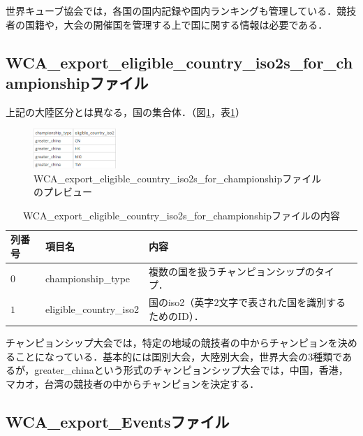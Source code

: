 \documentclass{article}
\begin{document}
  世界キューブ協会では，各国の国内記録や国内ランキングも管理している．競技者の国籍や，大会の開催国を管理する上で国に関する情報は必要である．\par

  \subsection{WCA\_export\_eligible\_country\_iso2s\_for\_championshipファイル}

  上記の大陸区分とは異なる，国の集合体．（図\ref{figure:eligible}，表\ref{table:eligible}）\par

  \begin{figure}[h]
    \centering
    \includegraphics[height=15mm]{eligible.png}
    \caption{WCA\_export\_eligible\_country\_iso2s\_for\_championshipファイルのプレビュー}
    \label{figure:eligible}
  \end{figure}

  \begin{table}[h]
    \centering
    \caption{WCA\_export\_eligible\_country\_iso2s\_for\_championshipファイルの内容}
    \label{table:eligible}
    \begin{tabular}{l|l|l}
      \hline
      列番号 & 項目名 & 内容 \\
      \hline \hline
      $ 0 $ & championship\_type & 複数の国を扱うチャンピョンシップのタイプ． \\
      $ 1 $ & eligible\_country\_iso2 & 国のiso2（英字$ 2 $文字で表された国を識別するためのID）． \\
      \hline
    \end{tabular}
  \end{table}

  チャンピョンシップ大会では，特定の地域の競技者の中からチャンピョンを決めることになっている．基本的には国別大会，大陸別大会，世界大会の$ 3 $種類であるが，greater\_chinaという形式のチャンピョンシップ大会では，中国，香港，マカオ，台湾の競技者の中からチャンピョンを決定する．\par

  \subsection{WCA\_export\_Eventsファイル}
\end{document}
